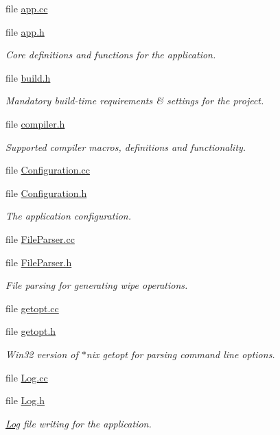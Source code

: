 \begin{DoxyCompactItemize}
\item 
file \hyperlink{app_8cc}{app.\-cc}
\item 
file \hyperlink{app_8h}{app.\-h}
\begin{DoxyCompactList}\small\item\em Core definitions and functions for the application. \end{DoxyCompactList}\item 
file \hyperlink{build_8h}{build.\-h}
\begin{DoxyCompactList}\small\item\em Mandatory build-\/time requirements \& settings for the project. \end{DoxyCompactList}\item 
file \hyperlink{compiler_8h}{compiler.\-h}
\begin{DoxyCompactList}\small\item\em Supported compiler macros, definitions and functionality. \end{DoxyCompactList}\item 
file \hyperlink{_configuration_8cc}{Configuration.\-cc}
\item 
file \hyperlink{_configuration_8h}{Configuration.\-h}
\begin{DoxyCompactList}\small\item\em The application configuration. \end{DoxyCompactList}\item 
file \hyperlink{_file_parser_8cc}{File\-Parser.\-cc}
\item 
file \hyperlink{_file_parser_8h}{File\-Parser.\-h}
\begin{DoxyCompactList}\small\item\em File parsing for generating wipe operations. \end{DoxyCompactList}\item 
file \hyperlink{getopt_8cc}{getopt.\-cc}
\item 
file \hyperlink{getopt_8h}{getopt.\-h}
\begin{DoxyCompactList}\small\item\em Win32 version of $\ast$nix getopt for parsing command line options. \end{DoxyCompactList}\item 
file \hyperlink{_log_8cc}{Log.\-cc}
\item 
file \hyperlink{_log_8h}{Log.\-h}
\begin{DoxyCompactList}\small\item\em \hyperlink{class_log}{Log} file writing for the application. \end{DoxyCompactList}\item 

\end{DoxyCompactItemize}
